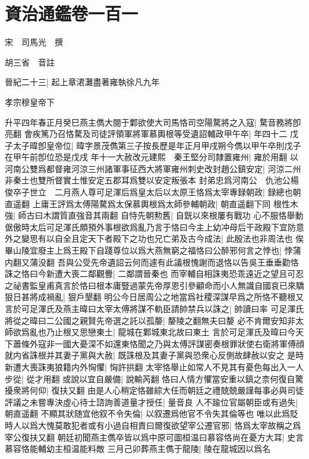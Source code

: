 \chapter{資治通鑑卷一百一}
宋　司馬光　撰

胡三省　音註

晉紀二十三|{
	起上章涒灘盡著雍執徐凡九年}


孝宗穆皇帝下

升平四年春正月癸巳燕主儁大閱于鄴欲使大司馬恪司空陽騖將之入寇|{
	騖音務將卽亮翻}
會疾篤乃召恪騖及司徒評領軍將軍慕輿根等受遺詔輔政甲午卒|{
	年四十二}
戊子太子暐卽皇帝位|{
	暐字景茂儁第三子按長歷是年正月甲戌朔今儁以甲午卒則戊子在甲午前卽位恐是戊戌}
年十一大赦改元建熙　秦王堅分司隸置雍州|{
	雍於用翻}
以河南公雙爲都督雍河涼三州諸軍事征西大將軍雍州刺史改封趙公鎮安定|{
	河涼二州非秦土也雙所督實土惟安定五郡耳爲雙以安定叛張本}
封弟忠爲河南公　仇池公楊俊卒子世立　二月燕人尊可足渾后爲皇太后以太原王恪爲太宰專録朝政|{
	録總也朝直遥翻}
上庸王評爲太傅陽騖爲太保慕輿根爲太師參輔朝政|{
	朝直遥翻下同}
根性木強|{
	師古曰木謂質直強音其兩翻}
自恃先朝勲舊|{
	自皝以來根屢有戰功}
心不服恪舉動倨傲時太后可足渾氏頗預外事根欲爲亂乃言于恪曰今主上幼冲母后干政殿下宜防意外之變思有以自全且定天下者殿下之功也兄亡弟及古今成法|{
	此殷法也非周法也}
俟畢山陵宜廢主上爲王殿下自踐尊位以爲大燕無窮之福恪曰公醉邪何言之悖也|{
	悖蒲内翻又蒲没翻}
吾與公受先帝遺詔云何而遽有此議根愧謝而退恪以告吳王垂垂勸恪誅之恪曰今新遭大喪二鄰觀釁|{
	二鄰謂晉秦也}
而宰輔自相誅夷恐乖遠近之望且可忍之祕書監皇甫真言於恪曰根本庸豎過蒙先帝厚恩引參顧命而小人無識自國哀已來驕狠日甚將成禍亂|{
	狠戶墾翻}
明公今日居周公之地當爲社稷深謀早爲之所恪不聽根又言於可足渾氏及燕主暐曰太宰太傅將謀不軌臣請帥禁兵以誅之|{
	帥讀曰率}
可足渾氏將從之暐曰二公國之親賢先帝選之託以孤嫠|{
	嫠陵之翻無夫曰嫠}
必不肯爾安知非太師欲爲亂也乃止根又思戀東土|{
	龍城在鄴城東北故曰東土}
言於可足渾氏及暐曰今天下蕭條外寇非一國大憂深不如還東恪聞之乃與太傅評謀密奏根罪狀使右衛將軍傅顔就内省誅根并其妻子黨與大赦|{
	既誅根及其妻子黨與恐衆心反側故肆赦以安之}
是時新遭大喪誅夷狼籍内外恟懼|{
	恟許拱翻}
太宰恪舉止如常人不見其有憂色每出入一人步從|{
	從才用翻}
或說以宜自嚴備|{
	說輸芮翻}
恪曰人情方懼當安重以鎮之柰何復自驚擾衆將何仰|{
	復扶又翻}
由是人心稍定恪雖綜大任而朝廷之禮兢兢嚴謹每事必與司徒評議之未嘗專決虛心待士諮詢善道量才授任|{
	量音良}
人不踰位官屬朝臣或有過失|{
	朝直遥翻}
不顯其狀随宜他叙不令失倫|{
	以叙遷爲他官不令失其倫等也}
唯以此爲貶時人以爲大愧莫敢犯者或有小過自相責曰爾復欲望宰公遷官邪|{
	恪爲太宰故稱之爲宰公復扶又翻}
朝廷初聞燕主儁卒皆以爲中原可圖桓温曰慕容恪尚在憂方大耳|{
	史言慕容恪能輔幼主桓温能料敵}
三月己卯葬燕主儁于龍陵|{
	陵在龍城因以爲名}
